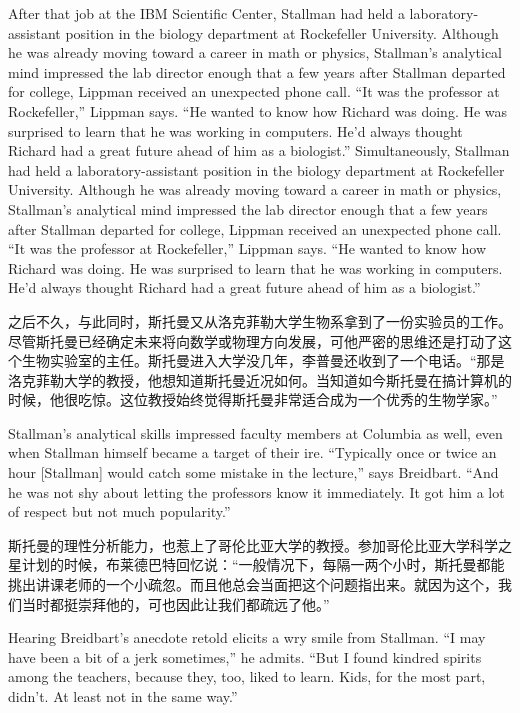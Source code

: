 \ifdefined\eng
\ifdefined\vone
After that job at the IBM Scientific Center, Stallman had held a laboratory-assistant position in the biology department at Rockefeller University. Although he was already moving toward a career in math or physics, Stallman's analytical mind impressed the lab director enough that a few years after Stallman departed for college, Lippman received an unexpected phone call. ``It was the professor at Rockefeller,'' Lippman says. ``He wanted to know how Richard was doing. He was surprised to learn that he was working in computers. He'd always thought Richard had a great future ahead of him as a biologist.''
\fi
\ifdefined\vtwo
Simultaneously, Stallman had held a laboratory-assistant position in the biology department at Rockefeller University. Although he was already moving toward a career in math or physics, Stallman's analytical mind impressed the lab director enough that a few years after Stallman departed for college, Lippman received an unexpected phone call. ``It was the professor at Rockefeller,'' Lippman says. ``He wanted to know how Richard was doing. He was surprised to learn that he was working in computers. He'd always thought Richard had a great future ahead of him as a biologist.''
\fi
\fi

\ifdefined\chs
\ifdefined\vone 之后不久，\fi\ifdefined\vtwo 与此同时，\fi 斯托曼又从洛克菲勒大学生物系拿到了一份实验员的工作。尽管斯托曼已经确定未来将向数学或物理方向发展，可他严密的思维还是打动了这个生物实验室的主任。斯托曼进入大学没几年，李普曼还收到了一个电话。``那是洛克菲勒大学的教授，他想知道斯托曼近况如何。当知道如今斯托曼在搞计算机的时候，他很吃惊。这位教授始终觉得斯托曼非常适合成为一个优秀的生物学家。''
\fi

\ifdefined\eng
Stallman's analytical skills impressed faculty members at Columbia as well, even when Stallman himself became a target of their ire. ``Typically once or twice an hour [Stallman] would catch some mistake in the lecture,'' says Breidbart. ``And he was not shy about letting the professors know it immediately. It got him a lot of respect but not much popularity.''
\fi

\ifdefined\chs
斯托曼的理性分析能力，也惹上了哥伦比亚大学的教授。参加哥伦比亚大学科学之星计划的时候，布莱德巴特回忆说：``一般情况下，每隔一两个小时，斯托曼都能挑出讲课老师的一个小疏忽。而且他总会当面把这个问题指出来。就因为这个，我们当时都挺崇拜他的，可也因此让我们都疏远了他。''
\fi

\ifdefined\eng
Hearing Breidbart's anecdote retold elicits a wry smile from Stallman. ``I may have been a bit of a jerk sometimes,'' he admits. ``But I found kindred spirits among \ifdefined\vone the \fi teachers, because they, too, liked to learn. Kids, for the most part, didn't. At least not in the same way.''
\fi

